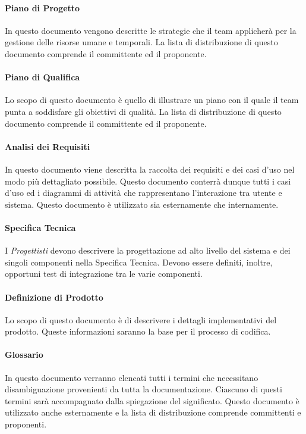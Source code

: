 \paragraph{Piano di Progetto }

In questo documento vengono descritte le strategie che il team
applicherà per la gestione delle risorse umane e temporali. La lista
di distribuzione di questo documento comprende il committente ed il
proponente. 

\paragraph{Piano di Qualifica }

Lo scopo di questo documento è quello di illustrare un piano con il
quale  il team punta a soddisfare gli obiettivi di qualità.  La lista
di distribuzione di questo documento comprende il committente ed il
proponente. 

\paragraph{Analisi dei Requisiti }

In questo documento viene descritta la raccolta dei requisiti e dei
casi d'uso nel modo più dettagliato possibile. Questo documento
conterrà dunque tutti i casi d'uso ed
i diagrammi di attività che rappresentano l'interazione 
tra utente e sistema. Questo documento è utilizzato sia
esternamente che internamente. 


\paragraph{Specifica Tecnica }
I  \emph{Progettisti}  devono descrivere la progettazione ad alto livello del
sistema e dei singoli componenti nella Specifica Tecnica. Devono
essere definiti, inoltre, opportuni test di integrazione tra le varie
componenti.



\paragraph{Definizione di Prodotto  }
Lo scopo di questo documento è di descrivere i dettagli implementativi del prodotto.
Queste informazioni saranno la base per il processo di codifica.

\paragraph{Glossario  }
In questo documento verranno elencati tutti i termini
che necessitano disambiguazione provenienti da tutta la documentazione.
Ciascuno di questi termini sarà accompagnato dalla spiegazione del
significato. Questo documento è utilizzato anche esternamente e la
lista di distribuzione comprende committenti e proponenti. 

